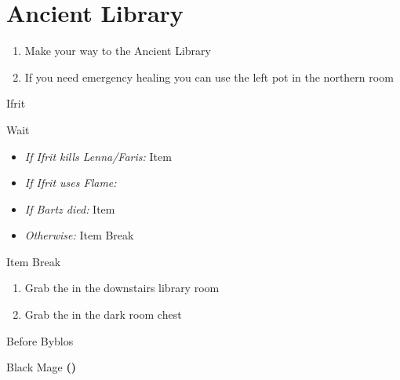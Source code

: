 \chapter{Ancient Library}

\vspace{\baselineskip}

\begin{paracol}{2}

\begin{enumerate}
    \item Make your way to the Ancient Library
    \item If you need emergency healing you can use the left pot in the northern room
\end{enumerate}

\begin{boss}{Ifrit}
    \varwb
    \begin{round}{1}
        \bartz Wait
        \begin{itemize}
            \item \textit{If Ifrit kills Lenna/Faris:} Item \then \battleGroup{\phoenixDown}
            \item \textit{If Ifrit uses Flame:} 
        \end{itemize}
        \anyone
        \begin{itemize}
            \item \textit{If Bartz died:} Item \then \battleGroup{\phoenixDown}
            \item \textit{Otherwise:} Item \then {} \then Break
        \end{itemize}
        \anyone Item \then {} \then Break
    \end{round}
    \varwe
\end{boss}

\begin{enumerate}[resume]
    \item Grab the  in the downstairs library room
    \item Grab the  in the dark room chest
\end{enumerate}

\begin{menu}{Before Byblos}
    \varwb
    \begin{itemMenu}
        \phoenixDownMenu {}
    \end{itemMenu}
    \begin{magicMenu}
        \faris \cure \space \then {}
    \end{magicMenu}
    \begin{jobMenu}
        \faris Black Mage \textbf{(\pointDown)}
    \end{jobMenu}
    \varwe
\end{menu}


\end{paracol}
